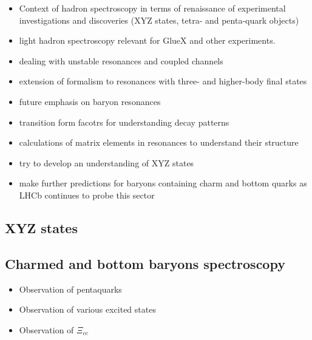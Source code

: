
\begin{itemize}
	\item Context of hadron spectroscopy in terms of renaissance of experimental investigations and discoveries (XYZ states, tetra- and penta-quark objects)
	\item light hadron spectroscopy relevant for GlueX and other experiments. 
	\item dealing with unstable resonances and coupled channels
	\item extension of formalism to resonances with  three- and higher-body final states
	\item future emphasis on baryon resonances
	\item transition form facotrs for understanding decay patterns
	\item calculations of matrix elements in resonances to understand their structure
	\item try to develop an understanding of XYZ states
	\item make further predictions for baryons containing charm and bottom quarks as LHCb continues to probe this sector
\end{itemize}











\subsection{XYZ states}

\subsection{Charmed and bottom baryons spectroscopy} 


\begin{itemize}
 \item Observation of pentaquarks \cite{Aaij:2015tga}
 \item Observation of various excited states
 \item Observation of $\Xi_{cc}$ \cite{Aaij:2017ueg}
\end{itemize}





